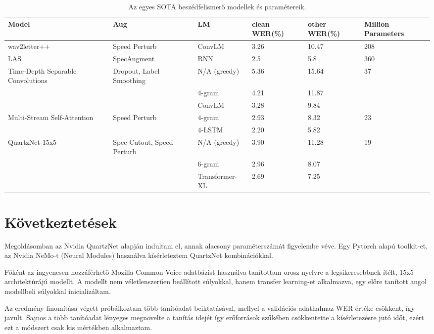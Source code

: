 \begin{table}[ht]
	\footnotesize
	\centering
	\begin{tabular}{ p{2cm} p{2.5cm} p{2.5cm} p{1.5cm} p{1.5cm} p{1.5cm} }
		\toprule
		\textbf{Model} & \textbf{Aug} & \textbf{LM} & \textbf{clean WER(\%)} & \textbf{other WER(\%)} & \textbf{Million Parameters} \\
		\midrule
		wav2letter++\cite{w2l} & Speed Perturb & ConvLM & 3.26 & 10.47 & 208 \\
		\hline
		LAS\cite{las} & SpecAugment & RNN & 2.5 & 5.8 & 360 \\
		\hline
		Time-Depth Separable Convolutions\cite{timedepth} & Dropout, Label Smoothing & N/A (greedy) & 5.36 & 15.64 & 37 \\
		&  & 4-gram & 4.21 & 11.87 &  \\
		&  & ConvLM & 3.28 & 9.84 &  \\
		\hline
		Multi-Stream Self-Attention\cite{attention} & Speed Perturb & 4-gram & 2.93 & 8.32 & 23  \\
		&  & 4-LSTM & 2.20 & 5.82 &  \\
		\hline
		QuartzNet-15x5\cite{quartznet} & Spec Cutout, Speed Perturb & N/A (greedy) & 3.90 & 11.28 & 19 \\
		&  & 6-gram & 2.96 & 8.07 &  \\
		&  & Transformer-XL & 2.69 & 7.25 &  \\
		\bottomrule
	\end{tabular}
	\caption{Az egyes SOTA beszédfelismerő modellek és paramétereik.}
\end{table}

\section{Következtetések}

Megoldásomban az Nvidia QuartzNet alapján indultam el, annak alacsony paraméterszámát figyelembe véve. Egy Pytorch alapú toolkit-et, az Nvidia NeMo-t (Neural Modules) használva kísérleteztem QuartzNet kombinációkkal.

Főként az ingyenesen hozzáférhető Mozilla Common Voice adatbázist használva tanítottam orosz nyelvre a legsikeresebbnek ítélt, 15x5 architektúrájú modellt. A modellt nem véletlenszerűen beállított súlyokkal, hanem transfer learning-et alkalmazva, egy előre tanított angol modellbeli súlyokkal inicializáltam.

Az eredmény finomítása végett próbálkoztam több tanítóadat beiktatásával, mellyel a validációs adathalmaz WER értéke csökkent, így javult. Sajnos a több tanítóadat lényeges megnövelte a tanítás idejét így erőforrások szűkében csökkentette a kísérletezésre jutó időt, ezért ezt a módszert csak kis mértékben alkalmaztam.
